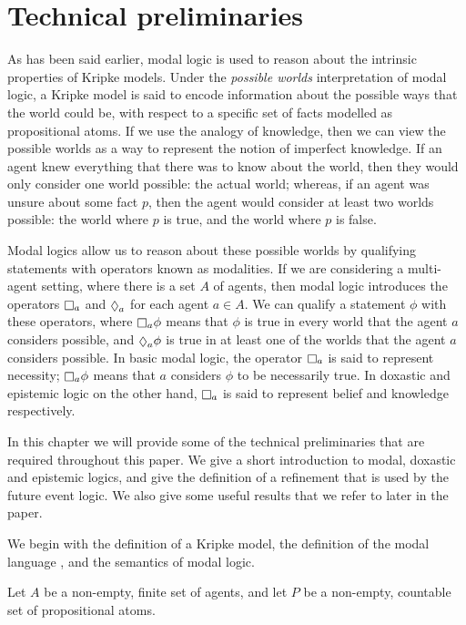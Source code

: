 \chapter{Technical preliminaries}

As has been said earlier, modal logic is used to reason about the intrinsic
properties of Kripke models. Under the {\em possible worlds} interpretation of
modal logic, a Kripke model is said to encode information about the possible
ways that the world could be, with respect to a specific set of facts modelled
as propositional atoms. If we use the analogy of knowledge, then we can view the
possible worlds as a way to represent the notion of imperfect knowledge. If an
agent knew everything that there was to know about the world, then they would
only consider one world possible: the actual world; whereas, if an agent was
unsure about some fact $p$, then the agent would consider at least two worlds
possible: the world where $p$ is true, and the world where $p$ is false.

Modal logics allow us to reason about these possible worlds by qualifying
statements with operators known as modalities. If we are considering a
multi-agent setting, where there is a set $A$ of agents, then modal logic
introduces the operators $\knows_a$ and $\suspects_a$ for each agent $a \in A$.
We can qualify a statement $\phi$ with these operators, where $\knows_a \phi$
means that $\phi$ is true in every world that the agent $a$ considers possible,
and $\suspects_a \phi$ is true in at least one of the worlds that the agent $a$
considers possible. In basic modal logic, the operator $\knows_a$ is said to
represent necessity; $\knows_a \phi$ means that $a$ considers $\phi$ to be
necessarily true. In doxastic and epistemic logic on the other hand, $\knows_a$
is said to represent belief and knowledge respectively.

In this chapter we will provide some of the technical preliminaries that are
required throughout this paper. We give a short introduction to modal, doxastic
and epistemic logics, and give the definition of a refinement that is used by
the future event logic. We also give some useful results that we refer to later
in the paper.

We begin with the definition of a Kripke model, the definition of the modal
language \lang{}, and the semantics of modal logic.

Let $A$ be a non-empty, finite set of agents, and let $P$ be a non-empty,
countable set of propositional atoms.

